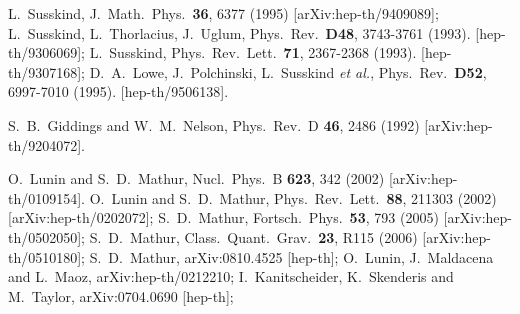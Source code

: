 \documentclass[12pt]{article}
\begin{document}
\begin{thebibliography}{10}
  L.~Susskind,
  J.\ Math.\ Phys.\  {\bf 36}, 6377 (1995)
  [arXiv:hep-th/9409089];
  L.~Susskind, L.~Thorlacius, J.~Uglum,
  Phys.\ Rev.\  {\bf D48}, 3743-3761 (1993).
  [hep-th/9306069];
  L.~Susskind,
  Phys.\ Rev.\ Lett.\  {\bf 71}, 2367-2368 (1993).
  [hep-th/9307168];
  D.~A.~Lowe, J.~Polchinski, L.~Susskind {\it et al.},
  Phys.\ Rev.\  {\bf D52}, 6997-7010 (1995).
  [hep-th/9506138].


  
  
  S.~B.~Giddings and W.~M.~Nelson,
  Phys.\ Rev.\  D {\bf 46}, 2486 (1992)
  [arXiv:hep-th/9204072].





O.~Lunin and S.~D.~Mathur,
  Nucl.\ Phys.\  B {\bf 623}, 342 (2002)
  [arXiv:hep-th/0109154].
O.~Lunin and S.~D.~Mathur,
  Phys.\ Rev.\ Lett.\  {\bf 88}, 211303 (2002)
  [arXiv:hep-th/0202072];
  S.~D.~Mathur,
  Fortsch.\ Phys.\  {\bf 53}, 793 (2005)
  [arXiv:hep-th/0502050];
  S.~D.~Mathur,
  Class.\ Quant.\ Grav.\  {\bf 23}, R115 (2006)
  [arXiv:hep-th/0510180];
  S.~D.~Mathur,
  arXiv:0810.4525 [hep-th];
  O.~Lunin, J.~Maldacena and L.~Maoz,
arXiv:hep-th/0212210;
%
I.~Kanitscheider, K.~Skenderis and M.~Taylor,
  arXiv:0704.0690 [hep-th];



\end{thebibliography}
\end{document}
